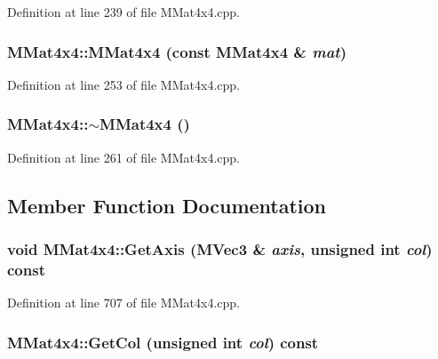 Definition at line 239 of file MMat4x4.cpp.\hypertarget{class_m_mat4x4_7eda878fcc79597fa4a04a54f640e02b}{
\subsubsection[{MMat4x4}]{\setlength{\rightskip}{0pt plus 5cm}MMat4x4::MMat4x4 (const {\bf MMat4x4} \& {\em mat})}}
\label{class_m_mat4x4_7eda878fcc79597fa4a04a54f640e02b}




Definition at line 253 of file MMat4x4.cpp.\hypertarget{class_m_mat4x4_753165b1650fd6150f9984cd58f9697a}{
\subsubsection[{$\sim$MMat4x4}]{\setlength{\rightskip}{0pt plus 5cm}MMat4x4::$\sim$MMat4x4 ()}}
\label{class_m_mat4x4_753165b1650fd6150f9984cd58f9697a}




Definition at line 261 of file MMat4x4.cpp.

\subsection{Member Function Documentation}
\hypertarget{class_m_mat4x4_a04d5d581a190e7449aff729d01ae5d4}{
\subsubsection[{GetAxis}]{\setlength{\rightskip}{0pt plus 5cm}void MMat4x4::GetAxis ({\bf MVec3} \& {\em axis}, \/  unsigned int {\em col}) const}}
\label{class_m_mat4x4_a04d5d581a190e7449aff729d01ae5d4}




Definition at line 707 of file MMat4x4.cpp.\hypertarget{class_m_mat4x4_6acc4e4a7706b2786b2e0fed62008eff}{
\subsubsection[{GetCol}]{ MMat4x4::GetCol (unsigned int {\em col}) const}}
\label{class_m_mat4x4_6acc4e4a7706b2786b2e0fed62008eff}




